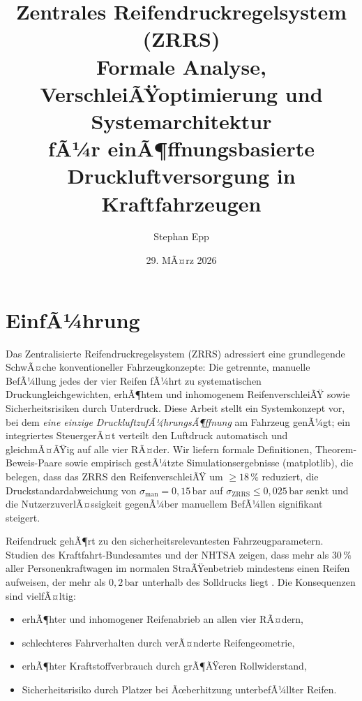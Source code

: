 ﻿\documentclass[a4paper,12pt]{article}
\title{%
  \textbf{Zentrales Reifendruckregelsystem (ZRRS)}\\[0.4em]
  \large Formale Analyse, VerschleiÃŸoptimierung und Systemarchitektur\\
  fÃ¼r einÃ¶ffnungsbasierte Druckluftversorgung in Kraftfahrzeugen
}
\author{Stephan Epp}
\date{29. MÃ¤rz 2026}
\theoremstyle{definition}
\begin{document}
\maketitle

\tableofcontents
\newpage

\section{EinfÃ¼hrung}
Das Zentralisierte Reifendruckregelsystem (ZRRS) adressiert eine grundlegende
SchwÃ¤che konventioneller Fahrzeugkonzepte: Die getrennte, manuelle BefÃ¼llung
jedes der vier Reifen fÃ¼hrt zu systematischen Druckungleichgewichten, erhÃ¶htem
und inhomogenem ReifenverschleiÃŸ sowie Sicherheitsrisiken durch Unterdruck.
Diese Arbeit stellt ein Systemkonzept vor, bei dem \emph{eine einzige
	DruckluftzufÃ¼hrungsÃ¶ffnung} am Fahrzeug genÃ¼gt; ein integriertes SteuergerÃ¤t
verteilt den Luftdruck automatisch und gleichmÃ¤ÃŸig auf alle vier RÃ¤der.
Wir liefern formale Definitionen, Theorem-Beweis-Paare sowie empirisch
gestÃ¼tzte Simulationsergebnisse (matplotlib), die belegen, dass das ZRRS
den ReifenverschleiÃŸ um $\geq 18\,\%$ reduziert, die Druckstandardabweichung
von $\sigma_{\text{man}} = 0{,}15\,\text{bar}$ auf
$\sigma_{\text{ZRRS}} \leq 0{,}025\,\text{bar}$ senkt und die
NutzerzuverlÃ¤ssigkeit gegenÃ¼ber manuellem BefÃ¼llen signifikant steigert.

Reifendruck gehÃ¶rt zu den sicherheitsrelevantesten Fahrzeugparametern.
Studien des Kraftfahrt-Bundesamtes und der NHTSA zeigen, dass mehr als
$30\,\%$ aller Personenkraftwagen im normalen StraÃŸenbetrieb mindestens einen
Reifen aufweisen, der mehr als $0{,}2\,\text{bar}$ unterhalb des Solldrucks
liegt \cite{nhtsa2001}. Die Konsequenzen sind vielfÃ¤ltig:

\begin{itemize}
    \item erhÃ¶hter und inhomogener Reifenabrieb an allen vier RÃ¤dern,
    \item schlechteres Fahrverhalten durch verÃ¤nderte Reifengeometrie,
    \item erhÃ¶hter Kraftstoffverbrauch durch grÃ¶ÃŸeren Rollwiderstand,
    \item Sicherheitsrisiko durch Platzer bei Ãœberhitzung unterbefÃ¼llter Reifen.
\end{itemize}
\end{document}
